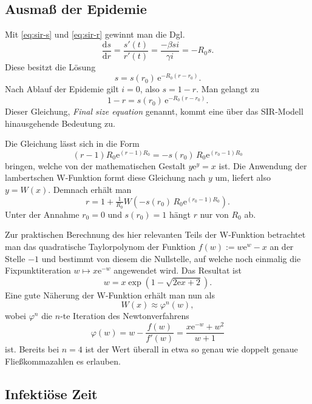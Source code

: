 \documentclass[a4paper,10pt,fleqn,twocolumn,twoside,dvipdfmx]{scrartcl}
\numberwithin{equation}{section}
\newcommand{\ee}{\mathrm e}
\begin{document}
\subsection{Ausmaß der Epidemie}

Mit \eqref{eq:sir-s} und \eqref{eq:sir-r} gewinnt man die Dgl.
\begin{equation}
\frac{\mathrm ds}{\mathrm dr} = \frac{s'(t)}{r'(t)}
= \frac{-\beta si}{\gamma i} = -R_0 s.
\end{equation}
Diese besitzt die Lösung
\begin{equation}
s = s(r_0)\,\ee^{-R_0 (r-r_0)}.
\end{equation}
Nach Ablauf der Epidemie gilt $i=0$, also $s=1-r$. Man gelangt zu%
\begin{equation}
1-r = s(r_0)\,\ee^{-R_0 (r-r_0)}.
\end{equation}
Dieser Gleichung, \emph{Final size equation} genannt,
kommt eine über das SIR-Modell hinausgehende Bedeutung zu.

Die Gleichung lässt sich in die Form
\begin{equation}
(r-1)R_0\ee^{(r-1)R_0} = -s(r_0)\,R_0\ee^{(r_0-1)R_0}
\end{equation}
bringen, welche von der mathematischen Gestalt $y\ee^y = x$ ist.
Die Anwendung der lambertschen W-Funktion formt diese Gleichung
nach $y$ um, liefert also $y=W(x)$. Demnach erhält man%
\begin{equation}
r = 1+\tfrac{1}{R_0}W(-s(r_0)\,R_0\ee^{(r_0-1)R_0}).
\end{equation}
Unter der Annahme $r_0=0$ und $s(r_0)=1$ hängt $r$ nur von
$R_0$ ab.

Zur praktischen Berechnung des hier relevanten Teils der W-Funktion
betrachtet man das quadratische Taylorpolynom der
Funktion $f(w):=w\ee^w-x$ an der Stelle $-1$ und
bestimmt von diesem die Nullstelle, auf welche noch einmalig die
Fixpunktiteration $w\mapsto x\ee^{-w}$ angewendet
wird. Das Resultat ist
\[w = x\exp(1-\sqrt{2\ee x+2}).\]
Eine gute Näherung der W-Funktion erhält man nun als
\[W(x)\approx \varphi^n(w),\]
wobei $\varphi^n$ die $n$-te Iteration des Newtonverfahrens
\[\varphi(w) = w-\frac{f(w)}{f'(w)} = \frac{x\ee^{-w}+w^2}{w+1}\]
ist. Bereits bei $n=4$ ist der Wert überall in etwa so genau wie
doppelt genaue Fließkommazahlen es erlauben.

\subsection{Infektiöse Zeit}
\end{document}
